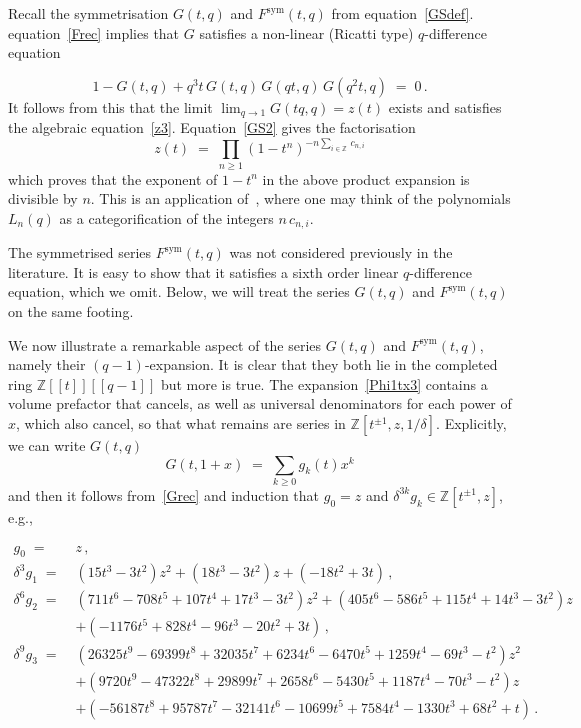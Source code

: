 \documentclass[12pt,reqno]{amsart}
\theoremstyle{definition}
\def\BZ{\mathbb Z}
\def\be{\begin{equation}}
\def\ee{\end{equation}}
\def\={\;=\;}
\def\sym{\mathrm{sym}}
\begin{document}
Recall the symmetrisation $G(t,q)$ and $F^\sym(t,q)$ from equation~\eqref{GSdef}.
equation~\eqref{Frec} implies that $G$ satisfies a non-linear (Ricatti type)
$q$-difference equation 

\be
\label{Grec}
1-G(t,q) +q^3 t \, G(t,q) \, G(q t,q) \, G(q^2 t,q)  \= 0 \,.
\ee
It follows from this that the limit $\lim_{q \to 1} G(tq,q) = z(t)$ exists and
satisfies the algebraic equation~\eqref{z3}. Equation~\eqref{GS2} gives
the factorisation
\be
\label{gexp}
z(t) \= \prod_{n \geq 1} %
(1-t^n)^{-n \sum_{i \in \BZ} \, c_{n,i}}
\ee
which proves that the exponent of $1-t^n$ in the above product expansion
is divisible by $n$. 
This is an application of~\cite{KS:cohomological}, where one may think of the
polynomials $L_n(q)$ as a categorification of the integers $n \, c_{n,i}$. 

The symmetrised series $F^\sym(t,q)$ was not considered previously in
the literature. It is easy to show that it satisfies a sixth order linear
$q$-difference equation, which we omit.
Below, we will treat the series $G(t,q)$ and $F^\sym(t,q)$ on the same footing.

We now illustrate a remarkable aspect of the series $G(t,q)$ and $F^\sym(t,q)$,
namely their $(q-1)$-expansion. It is clear that they both lie in the
completed ring $\BZ[\![t]\!][\![q-1]\!]$ but more is true. The
expansion~\eqref{Phi1tx3} contains a volume prefactor that cancels, as well
as universal denominators for each power of $x$, which also cancel, so that what
remains are series in $\BZ[t^{\pm 1},z,1/\delta]$. Explicitly, we can write $G(t,q)$ 
\be
\label{Gexp}
G(t,1+x) \= \sum_{k \geq 0} g_k(t) x^k
\ee
and then it follows from~\eqref{Grec} and induction that $g_0=z$ and 
$\delta^{3k} g_k \in \BZ[t^{\pm 1}, z]$, e.g., 


\be
\label{gvals3}
\begin{aligned}
g_0 \= & z\,,
\\
\delta^3 g_1 \= & (15 t^3 - 3 t^2) z^2 + (18 t^3 - 3 t^2) z + (-18 t^2 + 3 t)\,,
\\
\delta^6 g_2 \= & (711 t^6 - 708 t^5 + 107 t^4 + 17 t^3 - 3 t^2) z^2
+ (405 t^6 - 586 t^5 + 115 t^4 + 14 t^3 - 3 t^2) z
\\ & + (-1176 t^5 + 828 t^4 - 96 t^3 - 20 t^2 + 3 t)\,,
\\
\delta^{9} g_3 \= &
(26325 t^9 - 69399 t^8 + 32035 t^7 + 6234 t^6 - 6470 t^5 + 1259 t^4 - 69 t^3 - t^2) z^2
\\ &
+ (9720 t^9 - 47322 t^8 + 29899 t^7 + 2658 t^6 - 5430 t^5 + 1187 t^4 - 70 t^3 - t^2) z
\\ &
+ (-56187 t^8 + 95787 t^7 - 32141 t^6 - 10699 t^5 + 7584 t^4 - 1330 t^3 + 68 t^2 + t)
\,.
\end{aligned}
\ee
\end{document}
